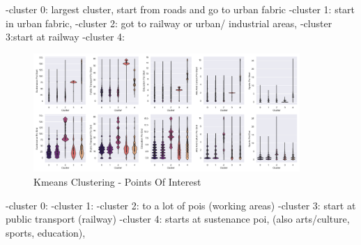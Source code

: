 -cluster 0: largest cluster, start from roads and go to urban fabric 
-cluster 1: start in urban fabric,
-cluster 2: got to railway or urban/ industrial areas, 
-cluster 3:start at railway
-cluster 4:

\begin{figure}[htp]
    \centering
    \includegraphics[width=0.9\textwidth]{Figures/Clustering/clusters_sustenance_poi_start.png}
    \caption{Kmeans Clustering - Points Of Interest}
    \label{fig:kmeans_poi}
\end{figure}

-cluster 0: 
-cluster 1: 
-cluster 2: to a lot of pois (working areas)
-cluster 3: start at public transport (railway)
-cluster 4: starts at sustenance poi, (also arts/culture, sports, education), 